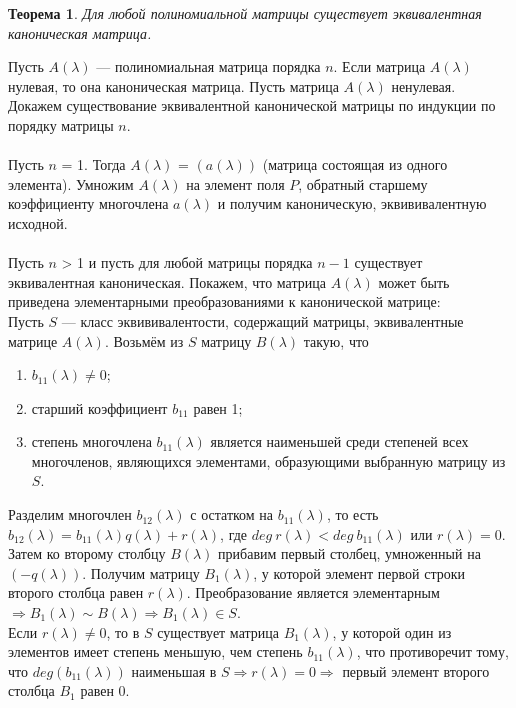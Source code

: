 \newtheorem*{th12_1_1}{Теорема}\begin{th12_1_1} Для любой полиномиальной матрицы существует эквивалентная каноническая матрица.
\end{th12_1_1}
\begin{Proof}
	Пусть $A(\lambda)$ --- полиномиальная матрица порядка $n$. Если матрица $A(\lambda)$ нулевая, то она каноническая матрица. Пусть матрица $A(\lambda)$ ненулевая. Докажем существование эквивалентной канонической матрицы по индукции по порядку матрицы $n$.\\\\
	Пусть $n$ = 1. Тогда $A(\lambda)$ = $(a(\lambda))$ (матрица состоящая из одного элемента). Умножим $A(\lambda)$ на элемент поля $P$, обратный старшему коэффициенту многочлена $a(\lambda)$ и получим каноническую, эквививалентную исходной.\\\\
	Пусть $n$ > 1 и пусть для любой матрицы порядка $n-1$ существует эквивалентная каноническая. Покажем, что матрица $A(\lambda)$ может быть приведена элементарными преобразованиями к канонической матрице:\\
	Пусть $S$ --- класс эквививалентости, содержащий матрицы, эквивалентные матрице $A(\lambda)$. Возьмём из $S$ матрицу $B(\lambda)$ такую, что\begin{enumerate}
		\item $b_{11}(\lambda) \not= 0$;
		\item старший коэффициент $b_{11}$ равен 1;
		\item степень многочлена $b_{11}(\lambda)$ является наименьшей среди степеней всех многочленов, являющихся элементами, образующими выбранную матрицу из $S$.
	\end{enumerate}
	Разделим многочлен $b_{12}(\lambda)$ с остатком на $b_{11}(\lambda)$, то есть $b_{12}(\lambda) = b_{11}(\lambda)q(\lambda) + r(\lambda)$, где $deg\ r(\lambda) < deg\ b_{11}(\lambda)$ или $r(\lambda) = 0$. Затем ко второму столбцу $B(\lambda)$ прибавим первый столбец, умноженный на $(-q(\lambda))$. Получим матрицу $B_1(\lambda)$, у которой элемент первой строки второго столбца равен $r(\lambda)$. Преобразование является элементарным $\Rightarrow B_1(\lambda) \sim B(\lambda) \Rightarrow B_1(\lambda) \in S$.\\
	Если $r(\lambda) \not= 0$, то в $S$ существует матрица $B_1(\lambda)$, у которой один из элементов имеет степень меньшую, чем степень $b_{11}(\lambda)$, что противоречит тому, что $deg(b_{11}(\lambda))$ наименьшая в $S \Rightarrow r(\lambda) = 0 \Rightarrow$ первый элемент второго столбца $B_1$ равен 0.\\

\end{Proof}
